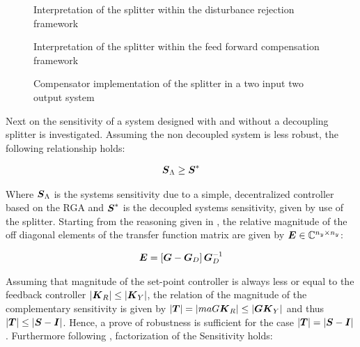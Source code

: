 \begin{figure}[h]
\begin{minipage}[t]{0.45\textwidth}

\caption{Interpretation of the splitter within the disturbance rejection framework}
\label{c:controller:f:splitter_disturbance}
\end{minipage}%
\hspace{0.05\textwidth}
\begin{minipage}[t]{0.45\textwidth}

\caption{Interpretation of the splitter within the feed forward compensation framework}
\label{c:controller:f:splitter_feedforward}
\end{minipage}
\end{figure}


\begin{figure}[h]
\centering

\caption{Compensator implementation of the splitter in a two input two output system}
\label{c:controller:f:splitter_tito}
\end{figure}


Next on the sensitivity of a system designed with and without a decoupling splitter is investigated. Assuming the non decoupled system is less robust, the following relationship holds:

\begin{align}
\mbox{\boldmath$S$}_{\Lambda} \geq \mbox{\boldmath$S$}^*
\end{align}

Where $\mbox{\boldmath$S$}_{\Lambda}$ is the systems sensitivity due to a simple, decentralized controller based on the RGA and $\mbox{\boldmath$S$}^*$ is the decoupled systems sensitivity, given by use of the splitter. Starting from the reasoning given in \cite[p.443 ff.]{Skogestad2005}, the relative magnitude of the off diagonal elements of the transfer function matrix are given by $\mbox{\boldmath$E$} \in \mathbb{C}^{n_y \times n_y}$:

\begin{align}
\mbox{\boldmath$E$} = \left[ \mbox{\boldmath$G$} - \mbox{\boldmath$G$}_D \right]\mbox{\boldmath$G$}_D^{-1}
\label{c:controller:e:InteractionMagnitude}
\end{align}

Assuming that magnitude of the set-point controller is always less or equal to the feedback controller $\left|\mbox{\boldmath$K$}_R \right|\leq \left|\mbox{\boldmath$K$}_Y\right|$, the relation of the magnitude of the complementary sensitivity is given by $\left|\mbox{\boldmath$T$}\right| = \left|ma{G} \mbox{\boldmath$K$}_R \right| \leq \left|\mbox{\boldmath$G$} \mbox{\boldmath$K$}_Y\right|$ and thus $\left|\mbox{\boldmath$T$}\right| \leq \left|\mbox{\boldmath$S$} - \mbox{\boldmath$I$}\right| $. Hence, a prove of robustness is sufficient for the case $\left|\mbox{\boldmath$T$}\right| = \left|\mbox{\boldmath$S$} - \mbox{\boldmath$I$}\right|$. Furthermore following \cite[p.443]{Skogestad2005}, factorization of the Sensitivity holds:

